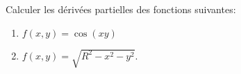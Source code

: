 
\begin{exercice}\label{exoOutilsMath-0022}

    Calculer les dérivées partielles des fonctions suivantes:
    \begin{enumerate}
        \item
            $f(x,y)=\cos(xy)$
        \item
            $f(x,y)=\sqrt{R^2-x^2-y^2}$.
    \end{enumerate}

\end{exercice}
